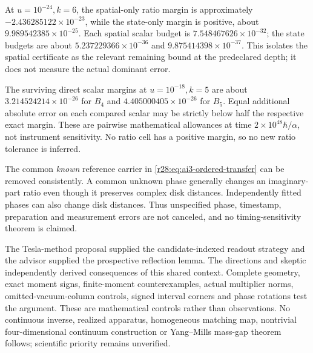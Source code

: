 At $u=10^{-24},k=6$, the spatial-only ratio margin is approximately $-2.436285122\times10^{-23}$, while the state-only margin is positive, about $9.989542385\times10^{-25}$. Each spatial scalar budget is $7.548467626\times10^{-32}$; the state budgets are about $5.237229366\times10^{-36}$ and $9.875414398\times10^{-37}$. This isolates the spatial certificate as the relevant remaining bound at the predeclared depth; it does not measure the actual dominant error.

The surviving direct scalar margins at $u=10^{-18},k=5$ are about $3.214524214\times10^{-26}$ for $B_4$ and $4.405000405\times10^{-26}$ for $B_5$. Equal additional absolute error on each compared scalar may be strictly below half the respective exact margin. These are pairwise mathematical allowances at time $2\times10^{48}\hbar/\alpha$, not instrument sensitivity. No ratio cell has a positive margin, so no new ratio tolerance is inferred.

The common \emph{known} reference carrier in \eqref{r28:eq:ai3-ordered-transfer} can be removed consistently. A common unknown phase generally changes an imaginary-part ratio even though it preserves complex disk distances. Independently fitted phases can also change disk distances. Thus unspecified phase, timestamp, preparation and measurement errors are not canceled, and no timing-sensitivity theorem is claimed.

The Tesla-method proposal supplied the candidate-indexed readout strategy and the advisor supplied the prospective reflection lemma. The directions and skeptic independently derived consequences of this shared context. Complete geometry, exact moment signs, finite-moment counterexamples, actual multiplier norms, omitted-vacuum-column controls, signed interval corners and phase rotations test the argument. These are mathematical controls rather than observations. No continuous inverse, realized apparatus, homogeneous matching map, nontrivial four-dimensional continuum construction or Yang--Mills mass-gap theorem follows; scientific priority remains unverified.
